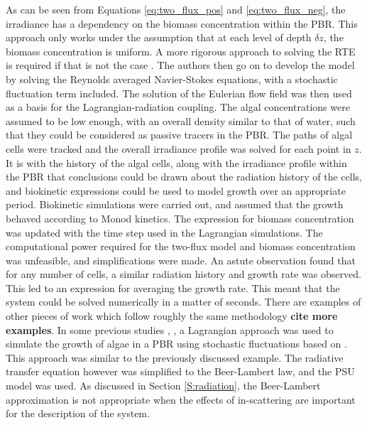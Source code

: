 

As can be seen from Equations \ref{eq:two_flux_pos} and \ref{eq:two_flux_neg}, the irradiance has a dependency on the biomass concentration within the PBR. This approach only works under the assumption that at each level of depth $\delta z$, the biomass concentration is uniform. A more rigorous approach to solving the RTE is required if that is not the case \cite{Pruvost2008}. The authors then go on to develop the model by solving the Reynolds averaged Navier-Stokes equations, with a stochastic fluctuation term included. The solution of the Eulerian flow field was then used as a basis for the Lagrangian-radiation coupling. The algal concentrations were assumed to be low enough, with an overall density similar to that of water, such that they could be considered as passive tracers in the PBR. The paths of algal cells were tracked and the overall irradiance profile was solved for each point in $z$. It is with the history of the algal cells, along with the irradiance profile within the PBR that conclusions could be drawn about the radiation history of the cells, and biokinetic expressions could be used to model growth over an appropriate period. Biokinetic simulations were carried out, and assumed that the growth behaved according to Monod kinetics. The expression for biomass concentration was updated with the time step used in the Lagrangian simulations. The computational power required for the two-flux model and biomass concentration was unfeasible, and simplifications were made. An astute observation found that for any number of cells, a similar radiation history and growth rate was observed. This led to an expression for averaging the growth rate. This meant that the system could be solved numerically in a matter of seconds. There are examples of other pieces of work which follow roughly the same methodology \cite{Marshall2011} \textbf{cite more examples}. In some previous studies \cite{Marshall2011}, \cite{Marschall2012}, a Lagrangian approach was used to simulate the growth of algae in a PBR using stochastic fluctuations based on \cite{Thomson1987}. This approach was similar to the previously discussed example. The radiative transfer equation however was simplified to the Beer-Lambert law, and the PSU model \cite{Eilers1988} was used. As discussed in Section \ref{S:radiation}, the Beer-Lambert approximation is not appropriate when the effects of in-scattering are important for the description of the system. 


